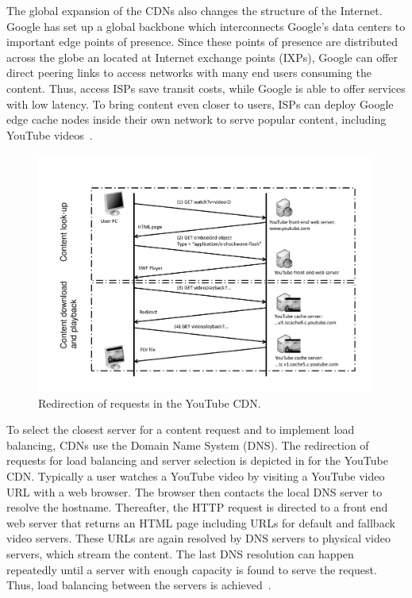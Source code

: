 The global expansion of the CDNs also changes the structure of the Internet.
Google has set up a global backbone which interconnects Google's data centers to important edge points of presence.
Since these points of presence are distributed across the globe an located at Internet exchange points (IXPs), Google can offer direct peering links to access networks with many end users consuming the content.
Thus, access ISPs save transit costs, while Google is able to offer services with low latency.
To bring content even closer to users, ISPs can deploy Google edge cache nodes inside their own network to serve popular content, including YouTube videos~\cite{gcc}.

\begin{figure}[bt]
\centering
\vspace{-0.2cm}
	\includegraphics[width=1.0\textwidth]{aslevel/figs/cacheServerSelection}
	\vspace{-0.2cm}
 	\caption{Redirection of requests in the YouTube CDN.}
 	\label{fig:aslevel:serverselection}
\end{figure}

To select the closest server for a content request and to implement load balancing, CDNs use the Domain Name System (DNS).
The redirection of requests for load balancing and server selection is depicted in  for the YouTube CDN.
Typically a user watches a YouTube video by visiting a YouTube video URL with a web browser.
The browser then contacts the local DNS server to resolve the hostname.
Thereafter, the HTTP request is directed to a front end web server that returns an HTML page including URLs for default and fallback video servers.
These URLs are again resolved by DNS servers to physical video servers, which stream the content.
The last DNS resolution can happen repeatedly until a server with enough capacity is found to serve the request.
Thus, load balancing between the servers is achieved~\cite{adhikari2012vivisecting}.

